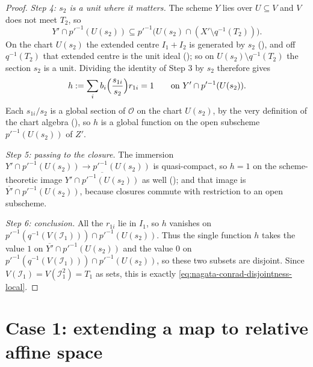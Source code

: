 \begin{proof}
  \emph{Step 4: $s_2$ is a unit where it matters.}  The scheme $Y$ lies over
  $U\subseteq V$ and $V$ does not meet $T_2$, so
  \[
    Y'\cap p'^{-1}(U(s_2))
      \subseteq p'^{-1}\bigl(U(s_2)\cap(X'\setminus q^{-1}(T_2))\bigr).
  \]
  On the chart $U(s_2)$ the extended centre $I_1+I_2$ is generated by $s_2$
  (), and off $q^{-1}(T_2)$
  that extended centre is the unit ideal
  (); so on
  $U(s_2)\setminus q^{-1}(T_2)$ the section $s_2$ is a unit.  Dividing the
  identity of Step 3 by $s_2$ therefore gives
  \[
    h:=\sum_ib_i\Bigl(\frac{s_{1i}}{s_2}\Bigr)r_{1i}=1
    \qquad\text{on }Y'\cap p'^{-1}(U(s_2)).
  \]
  Each $s_{1i}/s_2$ is a global section of $\mathcal O$ on the chart $U(s_2)$,
  by the very definition of the chart algebra
  (), so $h$ is a global function on the
  open subscheme $p'^{-1}(U(s_2))$ of $Z'$.

  \emph{Step 5: passing to the closure.}  The immersion
  $Y'\cap p'^{-1}(U(s_2))\to p'^{-1}(U(s_2))$ is quasi-compact, so $h=1$ on the
  scheme-theoretic image $\overline{Y'\cap p'^{-1}(U(s_2))}$ as well
  (); and that image is
  $\overline{Y'}\cap p'^{-1}(U(s_2))$, because closures commute with
  restriction to an open subscheme.

  \emph{Step 6: conclusion.}  All the $r_{1i}$ lie in $I_1$, so $h$ vanishes on
  $p'^{-1}(q^{-1}(V(\mathcal I_1)))\cap p'^{-1}(U(s_2))$.  Thus the single
  function $h$ takes the value $1$ on
  $\overline{Y'}\cap p'^{-1}(U(s_2))$ and the value $0$ on
  $p'^{-1}(q^{-1}(V(\mathcal I_1)))\cap p'^{-1}(U(s_2))$, so these two subsets
  are disjoint.  Since $V(\mathcal I_1)=V(\mathcal I_1^2)=T_1$ as sets, this is
  exactly \eqref{eq:nagata-conrad-disjointness-local}.
\end{proof}

\section{Case 1: extending a map to relative affine space}

